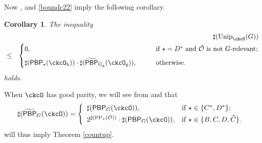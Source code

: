 \documentclass[12pt,a4paper]{amsart}
\newcommand{\CK}{{\mathcal {K}}}
\newcommand{\CO}{{\mathcal {O}}}
\numberwithin{equation}{section}
\newtheorem{prop}[thm]{Proposition}
\newtheorem{cor}[thm]{Corollary}
\theoremstyle{remark}
\def\Unip{\mathrm{Unip}}
\def\LC{{}^{\scriptscriptstyle L}\sC}
\def\Coh{\mathrm{Coh}}
\def\CPPs{\mathrm{PP}_{\star}}
\def\tPBP{\widetilde{\mathsf{PBP}}}
\def\PBP{\mathsf{PBP}}
\def\tPBP{\widetilde{\mathsf{PBP}}}
\begin{document}
Now ,  and \eqref{boundc22} imply the following corollary.
\begin{cor}\label{prop:countBCD22}
 The inequality
  \begin{eqnarray*}
 && \sharp(\Unip_{\ckcO}(G))\\
  & \leq & \begin{cases}
    0,  \qquad &  \text{if $\star=D^*$ and $\check \CO$ is not $G$-relevant;}\medskip \\
          \sharp (\PBP_{\star}(\ckcO_{\mathrm b}))\cdot \sharp(\tPBP_{G_{\mathrm g}}(\ckcO_{\mathrm g})), \qquad & \text{otherwise.}
       \end{cases}
  \end{eqnarray*}
  holds.
 \end{cor}



When $\ckcO $ has good parity, we will see from  and  that
  \[
    \sharp(\tPBP_{G}(\ckcO)) =
    \left\{
    \begin{array}{ll}
       \sharp (\PBP_{G}(\ckcO)),  & \hbox{if $\star\in \{C^*,D^*\}$}; \smallskip\\
       2^{\sharp(\CPPs(\check \CO))} \cdot \sharp (\PBP_{G}(\ckcO)),  &\hbox{if $\star\in \{B, C,D,\widetilde {C}\}$}.
    \end{array}
  \right.
  \]
  will thus imply Theorem \ref{countup}.%



\end{document}
